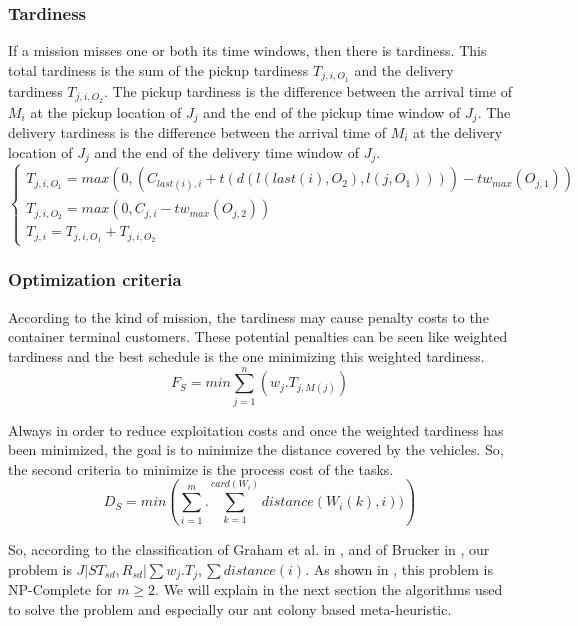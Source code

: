 \documentclass[a4paper,10pt]{article}
\begin{document}
\subsubsection{Tardiness}
If a mission misses one or both its time windows, then there is tardiness. This total tardiness is the sum of the pickup tardiness $T_{j,i,O_1}$ and the delivery tardiness $T_{j,i,O_2}$. The pickup tardiness is the difference between the arrival time of $M_i$ at the pickup location of $J_j$ and the end of the pickup time window of $J_j$. The delivery tardiness is the difference between the arrival time of $M_i$ at the delivery location of $J_j$ and the end of the delivery time window of $J_j$.
\begin{equation*}
 \begin{cases}
    T_{j,i,O_1} = max(0 , (C_{last(i),i} + t(d(l(last(i),O_2) , l(j, O_1)))) - tw_{max}(O_{j,1}))\\
    T_{j,i,O_2} = max(0 ,C_{j,i} - tw_{max}(O_{j,2}))\\
    T_{j,i} = T_{j,i,O_1} + T_{j,i,O_2}
\end{cases}
\end{equation*}

\subsubsection{Optimization criteria}

According to the kind of mission, the tardiness may cause penalty costs to the container terminal customers. These potential penalties can be seen like weighted tardiness and the best schedule is the one minimizing this weighted tardiness.
\begin{equation*}
    F_S = min \sum_{j=1}^{n}(w_j.T_{j,M(j)})
\end{equation*}

Always in order to reduce exploitation costs and once the weighted tardiness has been minimized, the goal is to minimize the distance covered by the vehicles. So, the second criteria to minimize is the process cost of the tasks.
\begin{equation*}
    D_S = min \left(\sum_{i=1}^{m}.\sum_{k=1}^{card(W_i)} distance(W_i(k), i))\right)
\end{equation*}



So, according to the classification of Graham et al. in \cite{Graham1979}, and of Brucker in \cite{Brucker2010}, our problem is ${ J|ST_{sd}, R_{sd}|\sum w_j.T_{j} , \sum distance(i)}$. As shown in \cite{Garey1976}, this problem is NP-Complete for $m\geq2$.
We will explain in the next section the algorithms used to solve the problem and especially our ant colony based meta-heuristic.
\end{document}
